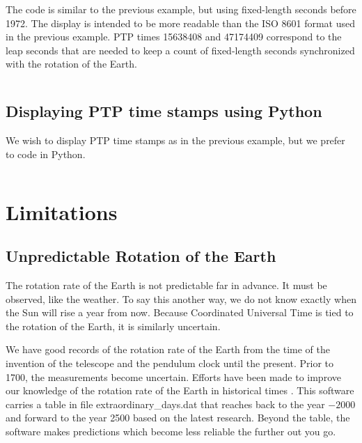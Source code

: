 \documentclass[letterpaper,twoside]{article}
\begin{document}
The code is similar to the previous example, but using
fixed-length seconds before 1972.  The display is intended to be
more readable than the ISO 8601 format used in the previous example.
PTP times \num{15638408} and \num{47174409} correspond to the leap
seconds that are needed to keep a count of fixed-length seconds
synchronized with the rotation of the Earth.

\inputminted[firstline=41,lastline=74]{c}{example_05.c}

\subsection{Displaying PTP time stamps using Python}
\label{example:PTP_using_Python}
We wish to display PTP time stamps as in the previous example,
but we prefer to code in Python.

\inputminted[firstline=27,lastline=69]{Python}{example_06.py}
  
\section{Limitations}
\subsection{Unpredictable Rotation of the Earth}
The rotation rate of the Earth is not predictable far in advance.  It must
be observed, like the weather.  To say this another way, we do not know
exactly when the Sun will rise a year from now.  Because Coordinated
Universal Time is tied to the rotation of the Earth, it is similarly
uncertain.

We have good records of the rotation rate of the Earth from the time
of the invention of the telescope and the pendulum clock until
the present.  Prior to 1700, the measurements become uncertain.
Efforts have been made to improve our knowledge of the rotation
rate of the Earth in historical times\citep{2004JHA....35..327M}%
\citep{2005JHA....36..339M}\citep{1997A&A...322..347S}%
\citep{2011ASSP...23....3S}\citep{1986PEPI...44..281M}%
\citep{Stephenson20160404}.
This software carries a table in file {\ttfamily extraordinary\_days.dat}
that reaches back to the year $-2000$ and forward to
the year \num{2500} based on the latest research.
Beyond the table, the software makes predictions which become less
reliable the further out you go.
\end{document}
